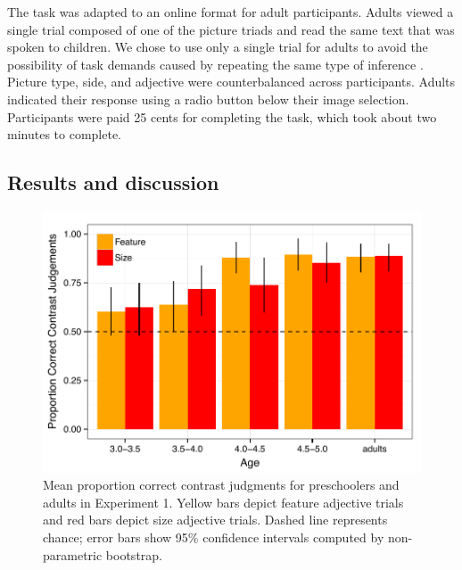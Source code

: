 \documentclass[man]{apa2}
\begin{document}
The task was adapted to an online format for adult participants.  Adults viewed a single trial composed of one of the picture triads and read the same text that was spoken to children. We chose to use only a single trial for adults to avoid the possibility of task demands caused by repeating the same type of inference \cite{frank2012}. Picture type, side, and adjective were counterbalanced across participants.  Adults indicated their response using a radio button below their image selection.  Participants were paid 25 cents for completing the task, which took about two minutes to complete. 

\subsection{Results and discussion}

\begin{figure}[t] 
  \begin{center} 
    \includegraphics[width=5in]{figures/expt1_mod.pdf} 
    \caption{\label{fig:expt1_kidsAdults} Mean proportion correct contrast judgments for preschoolers and adults in Experiment 1. Yellow bars depict feature adjective trials and red bars depict size adjective trials. Dashed line represents chance; error bars show 95\% confidence intervals computed by non-parametric bootstrap.}
  \end{center} 
\end{figure}	
\end{document}
